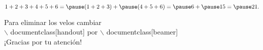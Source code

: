 \documentclass[handout]{beamer}
\begin{document}
\begin{frame}
\[1+2+3+4+5+6= \pause(1+2+3)+\pause(4+5+6) = \pause6 + \pause 15= \pause 21.\]

\pause Para eliminar los velos cambiar\\
$\backslash\!\!$ documentclass[handout] por  $\backslash\!\!$ documentclass[beamer]\\\Large{¡Gracias por tu atención!}
\end{frame}
\end{document}
